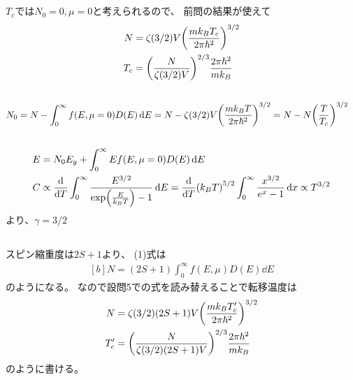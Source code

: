 \documentclass[../../sp_2021.tex]{subfiles}
\begin{document}
\subsection{}
\(T_c\)では\(N_0=0,\mu=0\)と考えられるので、
前問の結果が使えて
\begin{equation}\begin{aligned}[b]
    N &= \zeta(3/2)V\qty(\frac{mk_BT_c}{2\pi\hbar^2})^{3/2}\\
    T_c &= \qty(\frac{N}{\zeta(3/2)V})^{2/3}\frac{2\pi\hbar^2}{mk_B}
\end{aligned}\end{equation}

\subsection{}
\begin{equation}\begin{aligned}[b]
    N_0 &= N-\int_{0}^{\infty}f(E,\mu=0)D(E)\dd{E}
        = N-\zeta(3/2)V\qty(\frac{mk_BT}{2\pi\hbar^2})^{3/2}
        = N-N\qty(\frac{T}{T_c})^{3/2}
\end{aligned}\end{equation}

\subsection{}
\begin{equation}\begin{aligned}[b]
    E &= N_0E_g +\int_{0}^{\infty}Ef(E,\mu=0)D(E)\dd{E}\\
    C &\propto \dv{T} \int_{0}^{\infty}\frac{E^{3/2}}{\exp(\frac{E}{k_BT})-1}\dd{E}
        = \dv{T}(k_BT)^{5/2}\int_{0}^{\infty}\frac{x^{3/2}}{e^x-1}\dd{x}
        \propto T^{3/2}
\end{aligned}\end{equation}
より、\(\gamma=3/2\)

\subsection{}
スピン縮重度は\(2S+1\)より、
(1)式は
\begin{equation}\begin{aligned}[b]
    N =(2S+1)\int_{0}^{\infty}f(E,\mu)D(E)\dd{E}
\end{aligned}\end{equation}
のようになる。
なので設問5での式を読み替えることで転移温度は
\begin{equation}\begin{aligned}[b]
    N &= \zeta(3/2)(2S+1)V\qty(\frac{mk_BT_c'}{2\pi\hbar^2})^{3/2}\\
    T_c' &=  \qty(\frac{N}{\zeta(3/2)(2S+1)V})^{2/3}\frac{2\pi\hbar^2}{mk_B}
\end{aligned}\end{equation}
のように書ける。
\end{document}
